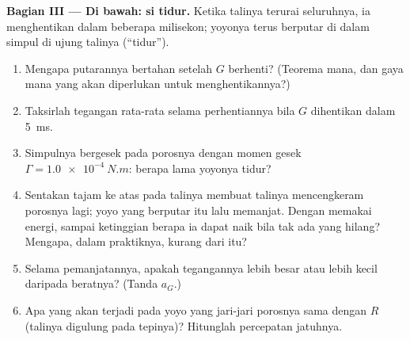 \begin{problem}
\medskip
\noindent\textbf{Bagian III --- Di bawah: si tidur.}
Ketika talinya terurai seluruhnya, ia menghentikan  dalam beberapa
milisekon; yoyonya terus berputar di dalam simpul di ujung
talinya (``tidur'').
\begin{enumerate}[resume]
  \item Mengapa putarannya bertahan setelah $G$ berhenti? (Teorema mana, dan
        gaya mana yang akan diperlukan untuk menghentikannya?)
  \item Taksirlah tegangan rata-rata selama perhentiannya bila $G$ dihentikan
        dalam \qty{5}{ms}.
  \item Simpulnya bergesek pada porosnya dengan momen gesek $\Gamma =
        \qty{1.0e-4}{N.m}$: berapa lama yoyonya tidur?
  \item Sentakan tajam ke atas pada talinya membuat talinya mencengkeram porosnya
        lagi; yoyo yang berputar itu lalu memanjat. Dengan memakai energi, sampai
        ketinggian berapa ia dapat naik bila tak ada yang hilang? Mengapa, dalam
        praktiknya, kurang dari itu?
  \item Selama pemanjatannya, apakah tegangannya lebih besar atau lebih kecil daripada
        beratnya? (Tanda $a_G$.)
  \item Apa yang akan terjadi pada yoyo yang jari-jari porosnya sama dengan $R$
        (talinya digulung pada tepinya)? Hitunglah percepatan jatuhnya.
\end{enumerate}


\end{problem}
